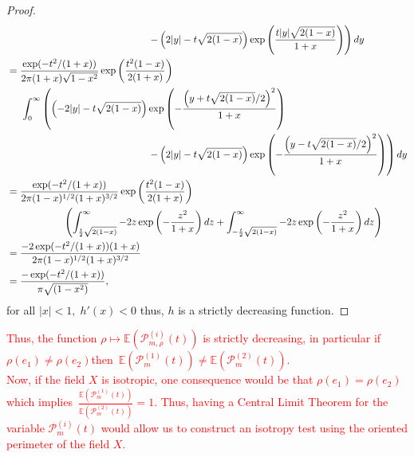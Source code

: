 \documentclass[12pt]{article}
\theoremstyle{Theorem}
\begin{document}
\begin{proof}
\begin{align*}
&\hspace{5cm}\left. - \left(2|y| - t\sqrt{2(1-x)}\right)\exp\left(\frac{t|y|\sqrt{2(1-x)}}{1+x}\right)\right)dy \\ 
& = \frac{\exp(-t^2/(1+x))}{2\pi(1+x)\sqrt{1-x^2}}\exp\left(\frac{t^2(1-x)}{2(1+x)}\right)\\
&\hspace{0.5cm} \int_{0}^{\infty}\left(\left(-2|y| -t\sqrt{2(1-x)}\right)\exp\left(-\frac{\left(y+t\sqrt{2(1-x)}/2\right)^{2}}{1+x}\right)\right. \\
&\hspace{5cm}\left. - \left(2|y| - t\sqrt{2(1-x)}\right)\exp\left(-\frac{\left(y-t\sqrt{2(1-x)}/2\right)^{2}}{1+x}\right)\right)dy \\
& = \frac{\exp(-t^2/(1+x))}{2\pi(1-x)^{1/2}(1+x)^{3/2}}\exp\left(\frac{t^2(1-x)}{2(1+x)}\right)\\
& \hspace{2cm} \left(\int_{\frac{t}{2}\sqrt{2(1-x)}}^{\infty}-2z\exp\left(-\frac{z^2}{1+x}\right)dz + \int_{-\frac{t}{2}\sqrt{2(1-x)}}^{\infty}-2z\exp\left(-\frac{z^2}{1+x}\right)dz \right)\\
& = \frac{-2\exp(-t^2/(1+x))(1+x)}{2\pi(1-x)^{1/2}(1+x)^{3/2}}\\
& = \frac{-\exp(-t^2/(1+x))}{\pi\sqrt{(1-x^2)}},
\end{align*}
for all $|x| < 1, \; h'(x) < 0$ thus, $h$ is a strictly decreasing function. 
\end{proof}
\textcolor{red}{Thus, the function $\rho \mapsto \mathbb{E}\left(\mathcal{P}^{\scriptscriptstyle (i)}_{m, \rho}(t)\right)$ is strictly decreasing, in particular if $\rho(e_1) \neq \rho(e_2) $\linebreak then~$\mathbb{E}\left(\mathcal{P}^{\scriptscriptstyle (1)}_{m}(t)\right) \neq \mathbb{E}\left(\mathcal{P}^{\scriptscriptstyle (2)}_{m}(t)\right)$.\\ 
Now, if the field $X$ is isotropic, one consequence would be that $\rho(e_{1}) = \rho(e_{2})$ which implies~$\frac{\mathbb{E}\left(\mathcal{P}^{\scriptscriptstyle (1)}_{m}(t)\right)}{\mathbb{E}\left(\mathcal{P}^{\scriptscriptstyle (2)}_{m}(t)\right)} = 1$. Thus, having a Central Limit Theorem for the variable $\mathcal{P}^{\scriptscriptstyle (i)}_{m}(t)$  would allow us to construct an isotropy test using the oriented perimeter of the field $X$.}
\end{document}
